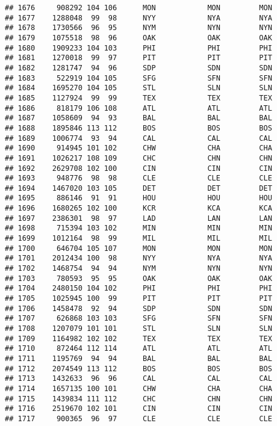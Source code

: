 \documentclass[]{article}
\begin{document}
\begin{verbatim}
## 1676     908292 104 106      MON            MON         MON
## 1677    1288048  99  98      NYY            NYA         NYA
## 1678    1730566  96  95      NYM            NYN         NYN
## 1679    1075518  98  96      OAK            OAK         OAK
## 1680    1909233 104 103      PHI            PHI         PHI
## 1681    1270018  99  97      PIT            PIT         PIT
## 1682    1281747  94  96      SDP            SDN         SDN
## 1683     522919 104 105      SFG            SFN         SFN
## 1684    1695270 104 105      STL            SLN         SLN
## 1685    1127924  99  99      TEX            TEX         TEX
## 1686     818179 106 108      ATL            ATL         ATL
## 1687    1058609  94  93      BAL            BAL         BAL
## 1688    1895846 113 112      BOS            BOS         BOS
## 1689    1006774  93  94      CAL            CAL         CAL
## 1690     914945 101 102      CHW            CHA         CHA
## 1691    1026217 108 109      CHC            CHN         CHN
## 1692    2629708 102 100      CIN            CIN         CIN
## 1693     948776  98  98      CLE            CLE         CLE
## 1694    1467020 103 105      DET            DET         DET
## 1695     886146  91  91      HOU            HOU         HOU
## 1696    1680265 102 100      KCR            KCA         KCA
## 1697    2386301  98  97      LAD            LAN         LAN
## 1698     715394 103 102      MIN            MIN         MIN
## 1699    1012164  98  99      MIL            MIL         MIL
## 1700     646704 105 107      MON            MON         MON
## 1701    2012434 100  98      NYY            NYA         NYA
## 1702    1468754  94  94      NYM            NYN         NYN
## 1703     780593  95  95      OAK            OAK         OAK
## 1704    2480150 104 102      PHI            PHI         PHI
## 1705    1025945 100  99      PIT            PIT         PIT
## 1706    1458478  92  94      SDP            SDN         SDN
## 1707     626868 103 103      SFG            SFN         SFN
## 1708    1207079 101 101      STL            SLN         SLN
## 1709    1164982 102 102      TEX            TEX         TEX
## 1710     872464 112 114      ATL            ATL         ATL
## 1711    1195769  94  94      BAL            BAL         BAL
## 1712    2074549 113 112      BOS            BOS         BOS
## 1713    1432633  96  96      CAL            CAL         CAL
## 1714    1657135 100 101      CHW            CHA         CHA
## 1715    1439834 111 112      CHC            CHN         CHN
## 1716    2519670 102 101      CIN            CIN         CIN
## 1717     900365  96  97      CLE            CLE         CLE

\end{verbatim}
\end{document}
